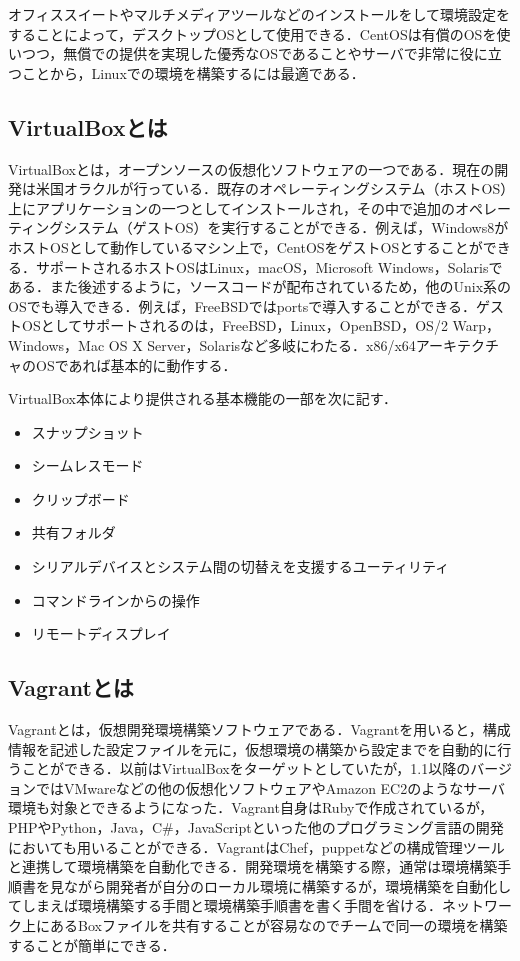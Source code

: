 オフィススイートやマルチメディアツールなどのインストールをして環境設定をすることによって，デスクトップOSとして使用できる．CentOSは有償のOSを使いつつ，無償での提供を実現した優秀なOSであることやサーバで非常に役に立つことから，Linuxでの環境を構築するには最適である\cite{centos}．

\newpage

\subsection{VirtualBoxとは}
VirtualBoxとは，オープンソースの仮想化ソフトウェアの一つである．現在の開発は米国オラクルが行っている．既存のオペレーティングシステム（ホストOS）上にアプリケーションの一つとしてインストールされ，その中で追加のオペレーティングシステム（ゲストOS）を実行することができる．例えば，Windows8がホストOSとして動作しているマシン上で，CentOSをゲストOSとすることができる．サポートされるホストOSはLinux，macOS，Microsoft Windows，Solarisである．また後述するように，ソースコードが配布されているため，他のUnix系のOSでも導入できる．例えば，FreeBSDではportsで導入することができる．ゲストOSとしてサポートされるのは，FreeBSD，Linux，OpenBSD，OS/2 Warp，Windows，Mac OS X Server，Solarisなど多岐にわたる．x86/x64アーキテクチャのOSであれば基本的に動作する\cite{vbox}．

VirtualBox本体により提供される基本機能の一部を次に記す．
\begin{itemize}
\item スナップショット
\item シームレスモード
\item クリップボード
\item 共有フォルダ
\item シリアルデバイスとシステム間の切替えを支援するユーティリティ
\item コマンドラインからの操作
\item リモートディスプレイ
\end{itemize}

\newpage

\subsection{Vagrantとは}
Vagrantとは，仮想開発環境構築ソフトウェアである．Vagrantを用いると，構成情報を記述した設定ファイルを元に，仮想環境の構築から設定までを自動的に行うことができる．以前はVirtualBoxをターゲットとしていたが，1.1以降のバージョンではVMwareなどの他の仮想化ソフトウェアやAmazon EC2のようなサーバ環境も対象とできるようになった．Vagrant自身はRubyで作成されているが，PHPやPython，Java，C\#，JavaScriptといった他のプログラミング言語の開発においても用いることができる．VagrantはChef，puppetなどの構成管理ツールと連携して環境構築を自動化できる．開発環境を構築する際，通常は環境構築手順書を見ながら開発者が自分のローカル環境に構築するが，環境構築を自動化してしまえば環境構築する手間と環境構築手順書を書く手間を省ける．ネットワーク上にあるBoxファイルを共有することが容易なのでチームで同一の環境を構築することが簡単にできる\cite{vagrant}．

